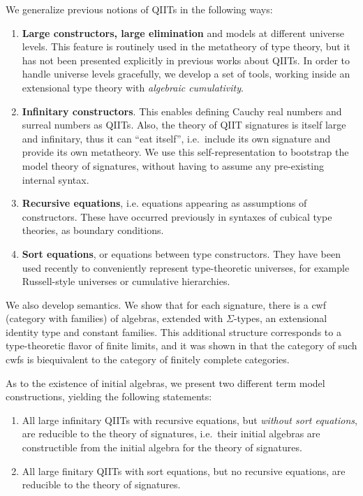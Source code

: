 \documentclass{llncs}
\begin{document}
We generalize previous notions of QIITs in the following ways:
\begin{enumerate}
  \item
  \textbf{Large constructors, large elimination} and models at different
  universe levels. This feature is routinely used in the metatheory of type
  theory, but it has not been presented explicitly in previous works about
  QIITs. In order to handle universe levels gracefully, we develop a set of
  tools, working inside an extensional type theory with \emph{algebraic
    cumulativity}.
  \item
  \textbf{Infinitary constructors}. This enables defining Cauchy real numbers
  and surreal numbers as QIITs. Also, the theory of QIIT signatures is itself
  large and infinitary, thus it can ``eat itself'', i.e.\ include its own
  signature and provide its own metatheory.  We use this self-representation to
  bootstrap the model theory of signatures, without having to assume any
  pre-existing internal syntax.
  \item
  \textbf{Recursive equations}, i.e. equations appearing as assumptions
  of constructors. These have occurred previously in syntaxes of cubical type
  theories, as boundary conditions.
  \item
  \textbf{Sort equations}, or equations between type constructors. They have
  been used recently to conveniently represent type-theoretic universes, for
  example Russell-style universes or cumulative hierarchies.
\end{enumerate}

We also develop semantics. We show that for each signature, there is a cwf
(category with families) of algebras, extended with $\Sigma$-types, an
extensional identity type and constant families. This additional structure
corresponds to a type-theoretic flavor of finite limits, and it was shown
in \cite{TODO} that the category of such cwfs is biequivalent to the category
of finitely complete categories.

As to the existence of initial algebras, we present two different term model
constructions, yielding the following statements:

\begin{enumerate}
\item
  All large infinitary QIITs with recursive equations, but \emph{without
  sort equations}, are reducible to the theory of signatures, i.e.\
  their initial algebras are constructible from the initial algebra for
  the theory of signatures.
\item
  All large finitary QIITs with sort equations, but no recursive equations,
  are reducible to the theory of signatures.
\end{enumerate}
\end{document}

